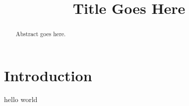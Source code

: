 \documentclass[conference]{IEEEtran}
\title{Title Goes Here}
\begin{document}
\maketitle

\begin{abstract}
  Abstract goes here.
\end{abstract}

\section{Introduction}

hello world
\end{document}
